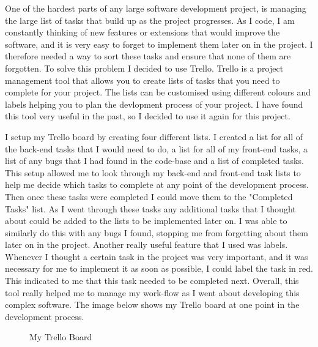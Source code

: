 One of the hardest parts of any large software development project, is managing the large list of tasks that build up as the project progresses. As I code, I am constantly thinking of new features or extensions that would improve the software, and it is very easy to forget to implement them later on in the project. I therefore needed a way to sort these tasks and ensure that none of them are forgotten. To solve this problem I decided to use Trello. Trello is a project management tool that allows you to create lists of tasks that you need to complete for your project. The lists can be customised using different colours and labels helping you to plan the devlopment process of your project. I have found this tool very useful in the past, so I decided to use it again for this project.

I setup my Trello board by creating four different lists. I created a list for all of the back-end tasks that I would need to do, a list for all of my front-end tasks, a list of any bugs that I had found in the code-base and a list of completed tasks. This setup allowed me to look through my back-end and front-end task lists to help me decide which tasks to complete at any point of the development process. Then once these tasks were completed I could move them to the "Completed Tasks" list. As I went through these tasks any additional tasks that I thought about could be added to the lists to be implemented later on. I was able to similarly do this with any bugs I found, stopping me from forgetting about them later on in the project. Another really useful feature that I used was labels. Whenever I thought a certain task in the project was very important, and it was necessary for me to implement it as soon as possible, I could label the task in red. This indicated to me that this task needed to be completed next. Overall, this tool really helped me to manage my work-flow as I went about developing this complex software. The image below shows my Trello board at one point in the development process.

\begin{figure}[!ht]
	\centering
	\caption{My Trello Board}
\end{figure}


